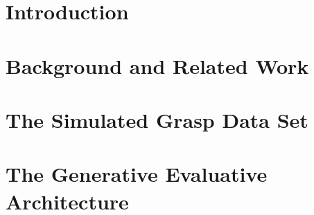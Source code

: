 \documentclass{ws-ijhr}
\begin{document}
\begin{abstract}

\end{abstract}


\section{Introduction}
% 
% 



\section{Background and Related Work}




% 



\section{The Simulated Grasp Data Set}
\label{section:simulation}


\section{The Generative Evaluative Architecture} \label{section:evaluative}
%
\end{document}

